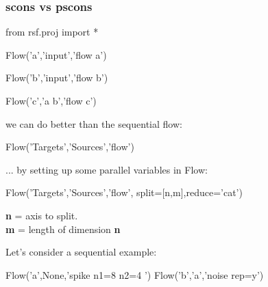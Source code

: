 \begin{frame}[fragile]
\frametitle{scons vs pscons}

\begin{python}
from rsf.proj import * 


Flow('a','input','flow a')

Flow('b','input','flow b')

Flow('c','a b','flow c')

\end{python}

\end{frame}

\begin{frame}
\end{frame}

\begin{frame}
\end{frame}



\begin{frame}[fragile]
\vfill 
we can do better than the sequential flow:
\begin{python}      
Flow('Targets','Sources','flow')
\end{python}
\vfill 
\end{frame}



\begin{frame}[fragile] 
\vfill 
... by setting up some parallel variables in Flow:
\begin{python}      
Flow('Targets','Sources','flow',
      split=[n,m],reduce='cat')
\end{python}
{\bf n} = axis to split. \\
{\bf m} = length of dimension {\bf n}
\vfill 
\end{frame}
 


\begin{frame}[fragile] 
Let's consider a sequential example:
\begin{python}
Flow('a',None,'spike n1=8 n2=4 ')
Flow('b','a','noise rep=y')
\end{python}
\end{frame}

\begin{frame}
\end{frame}




